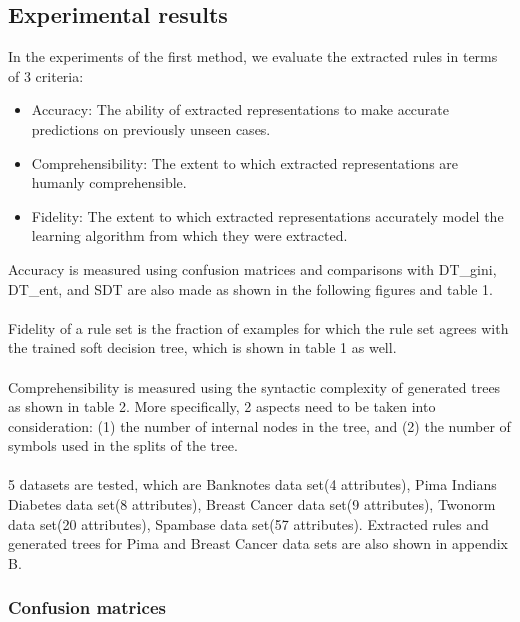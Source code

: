 \documentclass[12pt]{article}%
\begin{document}
\subsection{Experimental results}     
In the experiments of the first method, we evaluate the extracted rules in terms of 3 criteria\cite{craven1999rule}:
\begin{itemize}
\item Accuracy: The ability of extracted representations to make accurate predictions on previously unseen cases.
\item Comprehensibility: The extent to which extracted representations are humanly comprehensible.
\item Fidelity: The extent to which extracted representations accurately model the learning algorithm from which they were extracted.
\end{itemize}
Accuracy is measured using confusion matrices and comparisons with DT\_gini,  DT\_ent, and  SDT are also made as shown in the following figures and table 1. 
\\\\
Fidelity of a rule set is the fraction of examples for which the rule set agrees with the trained soft decision tree\cite{andrews1995survey}, which is shown in table 1 as well.
 \\\\
Comprehensibility is measured using the syntactic complexity of generated trees as shown in table 2. More specifically, 2 aspects need to be taken into consideration: (1) the number of internal nodes in the tree, and (2) the number of symbols used in the splits of the tree\cite{craven1996extracting}. 
\\\\
5 datasets are tested, which are Banknotes data set(4 attributes), Pima Indians Diabetes data set(8 attributes), Breast Cancer data set(9 attributes), Twonorm data set(20 attributes), Spambase data set(57 attributes). Extracted rules and generated trees for Pima and Breast Cancer data sets are also shown in appendix B.

\subsubsection{Confusion matrices}
\end{document}
